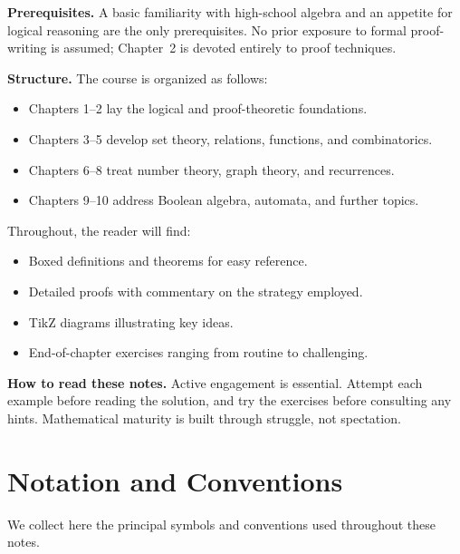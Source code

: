 \documentclass[12pt,a4paper,openany]{book}
\theoremstyle{definition}
\theoremstyle{plain}
\theoremstyle{remark}
\begin{document}
\medskip
\noindent\textbf{Prerequisites.} A basic familiarity with high-school algebra and an
appetite for logical reasoning are the only prerequisites. No prior exposure to formal
proof-writing is assumed; Chapter~2 is devoted entirely to proof techniques.

\medskip
\noindent\textbf{Structure.} The course is organized as follows:
\begin{itemize}[nosep]
  \item Chapters 1--2 lay the logical and proof-theoretic foundations.
  \item Chapters 3--5 develop set theory, relations, functions, and combinatorics.
  \item Chapters 6--8 treat number theory, graph theory, and recurrences.
  \item Chapters 9--10 address Boolean algebra, automata, and further topics.
\end{itemize}

\noindent Throughout, the reader will find:
\begin{itemize}[nosep]
  \item Boxed definitions and theorems for easy reference.
  \item Detailed proofs with commentary on the strategy employed.
  \item TikZ diagrams illustrating key ideas.
  \item End-of-chapter exercises ranging from routine to challenging.
\end{itemize}

\medskip
\noindent\textbf{How to read these notes.} Active engagement is essential. Attempt each
example before reading the solution, and try the exercises before consulting any hints.
Mathematical maturity is built through struggle, not spectation.

\chapter*{Notation and Conventions}
\label{ch:notation}

We collect here the principal symbols and conventions used throughout these notes.
\end{document}
